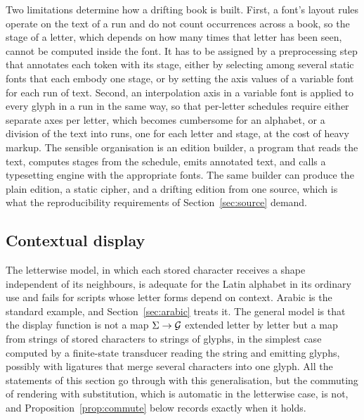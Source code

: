 Two limitations determine how a drifting book is built. First, a font's layout rules operate on the text of a run and do not count occurrences across a book, so the stage of a letter, which depends on how many times that letter has been seen, cannot be computed inside the font. It has to be assigned by a preprocessing step that annotates each token with its stage, either by selecting among several static fonts that each embody one stage, or by setting the axis values of a variable font for each run of text. Second, an interpolation axis in a variable font is applied to every glyph in a run in the same way, so that per-letter schedules require either separate axes per letter, which becomes cumbersome for an alphabet, or a division of the text into runs, one for each letter and stage, at the cost of heavy markup. The sensible organisation is an edition builder, a program that reads the text, computes stages from the schedule, emits annotated text, and calls a typesetting engine with the appropriate fonts. The same builder can produce the plain edition, a static cipher, and a drifting edition from one source, which is what the reproducibility requirements of Section~\ref{sec:source} demand.

\subsection{Contextual display}

The letterwise model, in which each stored character receives a shape independent of its neighbours, is adequate for the Latin alphabet in its ordinary use and fails for scripts whose letter forms depend on context. Arabic is the standard example, and Section~\ref{sec:arabic} treats it. The general model is that the display function is not a map $\Sigma\to\mathcal{G}$ extended letter by letter but a map from strings of stored characters to strings of glyphs, in the simplest case computed by a finite-state transducer reading the string and emitting glyphs, possibly with ligatures that merge several characters into one glyph. All the statements of this section go through with this generalisation, but the commuting of rendering with substitution, which is automatic in the letterwise case, is not, and Proposition~\ref{prop:commute} below records exactly when it holds.
